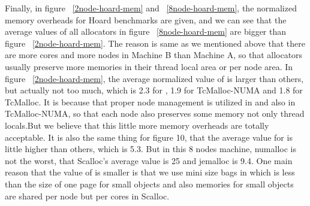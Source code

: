 Finally, in figure ~\ref{2node-hoard-mem} and ~\ref{8node-hoard-mem}, the normalized memory overheads for Hoard benchmarks are given, and we can see that the average values of all allocators in figure ~\ref{8node-hoard-mem} are bigger than figure ~\ref{2node-hoard-mem}. The reason is same as we mentioned above that there are more cores and more nodes in Machine B than Machine A, so that allocators usually preserve more memories in their thread local area or per node area. In figure ~\ref{2node-hoard-mem}, the average normalized value of \NM{} is larger than others, but actually not too much, which is 2.3 for \NM{}, 1.9 for TcMalloc-NUMA and 1.8 for TcMalloc. It is because that proper node management is utilized in \NM{} and also in TcMalloc-NUMA, so that each node also preserves some memory not only thread locals.But we believe that this little more memory overheads are totally acceptable. It is also the same thing for figure 10, that the average value for \NM{} is little higher than others, which is 5.3. But in this 8 nodes machine, numalloc is not the worst, that Scalloc's average value is 25 and jemalloc is 9.4. One main reason that the value of \NM{} is smaller is that we use mini size bags in \NM{} which is less than the size of one page for small objects and also memories for small objects are shared per node but per cores in Scalloc.